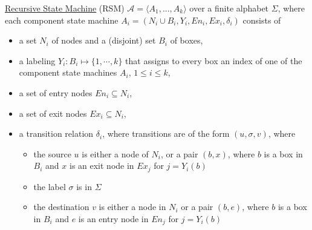 \documentclass[a4paper,12pt]{article}
\begin{document}
\underline{Recursive State Machine} (RSM) $\mathcal{A}=\langle A_1, ..., A_k \rangle$ over a finite alphabet $\Sigma$, where each component state machine $A_i=(N_i \cup B_i, Y_i, En_i, Ex_i, \delta_i)$ consists of
\begin{itemize}
	\item a set $N_i$ of nodes and a (disjoint) set $B_i$ of boxes,
	\item a labeling $Y_i: B_i \mapsto \{1, \cdots, k\}$ that assigns to every box an index of one of the component state machines $A_i$, $1 \leq i \leq k$,
	\item a set of entry nodes $En_i \subseteq N_i$,
	\item a set of exit nodes $Ex_i \subseteq N_i$,
	\item a transition relation $\delta_i$, where transitions are of the form $(u, \sigma, v)$, where
	\begin{itemize}
		\item the source $u$ is either a node of $N_i$, or a pair $(b,x)$, where $b$ is a box in $B_i$ and $x$ is an exit node in $Ex_j$ for $j=Y_i(b)$
		\item the label $\sigma$ is in $\Sigma$
		\item the destination $v$ is either a node in $N_i$ or a pair $(b,e)$, where $b$ is a box in $B_i$ and $e$ is an entry node in $En_j$ for $j=Y_i(b)$
	\end{itemize}
\end{itemize}
\end{document}
